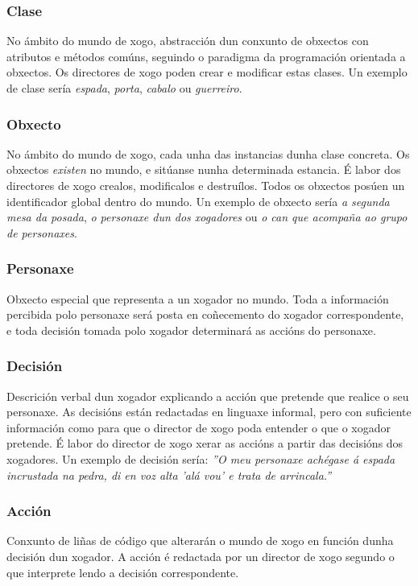 \subsubsection{Clase}
No ámbito do mundo de xogo, abstracción dun conxunto de obxectos con atributos e
métodos comúns, seguindo o paradigma da programación orientada a obxectos. Os
directores de xogo poden crear e modificar estas clases.
Un exemplo de clase sería {\it espada}, {\it porta}, {\it cabalo} ou {\it
guerreiro}.

\subsubsection{Obxecto}
No ámbito do mundo de xogo, cada unha das instancias dunha clase concreta. Os
obxectos {\it existen} no mundo, e sitúanse nunha determinada estancia. É labor
dos directores de xogo crealos, modificalos e destruílos. Todos os obxectos
posúen un identificador global dentro do mundo.
Un exemplo de obxecto sería {\it a segunda mesa da posada}, {\it o personaxe dun
dos xogadores} ou {\it o can que acompaña ao grupo de personaxes}.

\subsubsection{Personaxe}
Obxecto especial que representa a un xogador no mundo. Toda a información
percibida polo personaxe será posta en coñecemento do xogador correspondente, e
toda decisión tomada polo xogador determinará as accións do personaxe.

\subsubsection{Decisión}
Descrición verbal dun xogador explicando a acción que pretende que realice o seu
personaxe. As decisións están redactadas en linguaxe informal, pero con
suficiente información como para que o director de xogo poda entender o que o
xogador pretende. É labor do director de xogo xerar as accións a partir das
decisións dos xogadores.
Un exemplo de decisión sería: {\it ''O meu personaxe achégase á espada
incrustada na pedra, di en voz alta 'alá vou' e trata de arrincala.''}

\subsubsection{Acción}
Conxunto de liñas de código que alterarán o mundo de xogo en función dunha
decisión dun xogador. A acción é redactada por un director de xogo segundo o que
interprete lendo a decisión correspondente.

